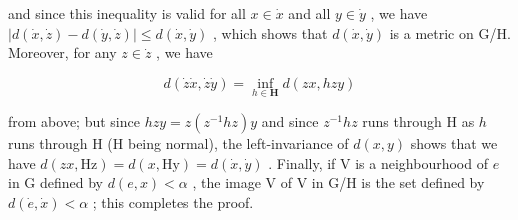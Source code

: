 and since this inequality is valid for all \(x \in \dot{x}\) and all \(y \in \dot{y}\) , we have \(|d(\dot{x}, \dot{z}) - d(\dot{y}, \dot{z})| \leqslant d(\dot{x}, \dot{y})\) , which shows that \(d(\dot{x}, \dot{y})\) is a metric on G/H. Moreover, for any \(z \in \dot{z}\) , we have

\[
d (\dot {z} \dot {x}, \dot {z} \dot {y}) = \inf _ {h \in \mathbf {H}} d (z x, h z y)
\]

from above; but since \(hzy = z(z^{-1}hz)y\) and since \(z^{-1}hz\) runs through H as \(h\) runs through H (H being normal), the left-invariance of \(d(x,y)\) shows that we have \(d(zx, \mathrm{Hz}) = d(x, \mathrm{Hy}) = d(\dot{x}, \dot{y})\) . Finally, if V is a neighbourhood of \(e\) in G defined by \(d(e, x) < \alpha\) , the image V of V in G/H is the set defined by \(d(\dot{e}, \dot{x}) < \alpha\) ; this completes the proof.


